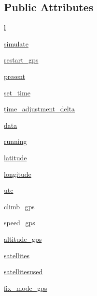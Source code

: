 \subsection*{Public Attributes}
\begin{DoxyCompactItemize}
\item 
\hyperlink{classgps__mtk3339_1_1gps__mtk3339_a93b7dfcb873983c3b9954afd741bb0aa}{l}
\item 
\hyperlink{classgps__mtk3339_1_1gps__mtk3339_a0b660f851b889fd51697772bea5a2298}{simulate}
\item 
\hyperlink{classgps__mtk3339_1_1gps__mtk3339_a988087d2eb3d19966849c601052fb030}{restart\+\_\+gps}
\item 
\hyperlink{classgps__mtk3339_1_1gps__mtk3339_a3dda95763250fe6d040fc99f983aa525}{present}
\item 
\hyperlink{classgps__mtk3339_1_1gps__mtk3339_a6d478bb42c50a33dbf6b3237db07f60f}{set\+\_\+time}
\item 
\hyperlink{classgps__mtk3339_1_1gps__mtk3339_a0c092f05378b720b0b426d80f42456e3}{time\+\_\+adjustment\+\_\+delta}
\item 
\hyperlink{classgps__mtk3339_1_1gps__mtk3339_a4446b75d60332e06ac86e47117c2b5c7}{data}
\item 
\hyperlink{classgps__mtk3339_1_1gps__mtk3339_a1e3e0382d54d662346c6ce131a3a7a1c}{running}
\item 
\hyperlink{classgps__mtk3339_1_1gps__mtk3339_ae1aa1ac46a38d83b9a0147401ee82b9d}{latitude}
\item 
\hyperlink{classgps__mtk3339_1_1gps__mtk3339_a8cec49a353d5c9841d744619010be747}{longitude}
\item 
\hyperlink{classgps__mtk3339_1_1gps__mtk3339_aa7849c72105267400545a92f8bebc5a4}{utc}
\item 
\hyperlink{classgps__mtk3339_1_1gps__mtk3339_a1553a20b53503d886d324a85090f8eae}{climb\+\_\+gps}
\item 
\hyperlink{classgps__mtk3339_1_1gps__mtk3339_ad95b0301903fcc226e36d058c8849a65}{speed\+\_\+gps}
\item 
\hyperlink{classgps__mtk3339_1_1gps__mtk3339_a741b7970706c13f0128d33293e5ea1ca}{altitude\+\_\+gps}
\item 
\hyperlink{classgps__mtk3339_1_1gps__mtk3339_a5fa5839836a0c4bb31d29e6c1efe4264}{satellites}
\item 
\hyperlink{classgps__mtk3339_1_1gps__mtk3339_a9e594b0808ce07f48847a6ce4e3ebb32}{satellitesused}
\item 
\hyperlink{classgps__mtk3339_1_1gps__mtk3339_a21c1e61f981fb2ae8ef32890bac4c89d}{fix\+\_\+mode\+\_\+gps}

\end{DoxyCompactItemize}
